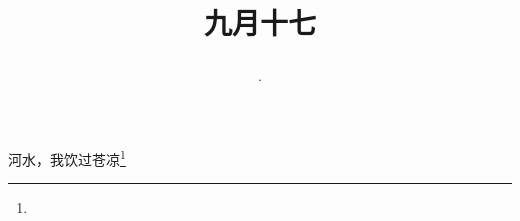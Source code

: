 \title{\date[d=19,m=10,y=2024][year:cn-y,年,month:cn,day:cn,日,·,weekday]·九月十七 }
河水，我饮过苍凉\footnote{ }

